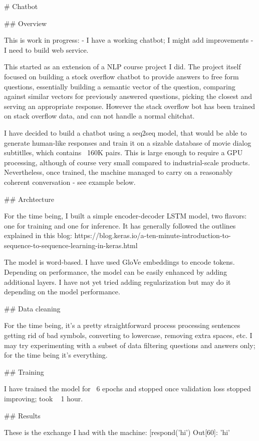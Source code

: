 # Chatbot

## Overview

This is work in progress: 
- I have a working chatbot; I might add improvements
- I need to build web service.

This started as an extension of a NLP course project I did. The project itself focused on building a stock overflow chatbot to provide answers to free form questions, essentially building a semantic vector of the question, comparing against similar vectors for previously answered questions, picking the closest and serving an appropriate response. However the stack overflow bot has been trained on stack overflow data, and can not handle a normal chitchat. 

I have decided to build a chatbot using a seq2seq model, that would be able to generate human-like responses and train it on a sizable database of movie dialog subtitlles, which contains ~160K pairs. This is large enough to require a GPU processing, although of course very small compared to industrial-scale products. Nevertheless, once trained, the machine managed to carry on a reasonably coherent conversation - see example below.


## Archtecture

For the time being, I built a simple encoder-decoder LSTM model, two flavors: one for training and one for inference. It has generally followed the outlines explained in this blog:
https://blog.keras.io/a-ten-minute-introduction-to-sequence-to-sequence-learning-in-keras.html

The model is word-based. I have used GloVe embeddings to encode tokens. Depending on performance, the model can be easily enhanced by adding additional layers. I have not yet tried adding regularization but may do it depending on the model performance.


## Data cleaning

For the time being, it's a pretty straightforward process processing sentences getting rid of bad symbols, converting to lowercase, removing extra spaces, etc. I may try experimenting with a subset of data filtering questions and answers only; for the time being it's everything.

## Training

I have trained the model for ~6 epochs and stopped once validation loss stopped improving; took ~ 1 hour.



## Results

These is the exchange I had with the machine:
[respond('hi')
Out[60]: 'hi'

